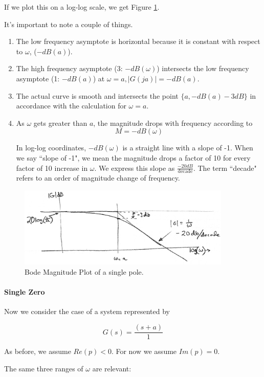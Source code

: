 If we plot this on a log-log scale, we get Figure \ref{BodeMagOnePole}.

It's important to note a couple of things.

\begin{enumerate}
  \item The low frequency asymptote is horizontal because it is constant with respect to $\omega$, ($-dB(a)$).
  \item The high frequency asymptote (3: $-dB(\omega)$) intersects 
         the low frequency asymptote (1: $-dB(a)$) at $\omega = a, |G(ja)| = -dB(a)$.
  \item The actual curve is smooth and intersects the point $\{a, -dB(a)-3dB\}$ in accordance with 
  the calculation for  $\omega = a$.
  \item As $\omega$ gets greater than $a$, the magnitude drops with frequency according to
  $$ M = -dB(\omega) $$

In log-log coordinates, $-dB(\omega)$ is a straight line with a slope of -1.  When we say ``slope of -1", we mean the magnitude drops a factor of 10 for every factor of 10 increase in $\omega$.   We express this slope as $\frac{-20dB}{\mathrm{decade}}$. The term ``decade" refers to an order of magnitude change of frequency.

\end{enumerate}


\begin{figure}\centering
\includegraphics[width=4.0in]{figs05/00734a.png}
\caption{Bode Magnitude Plot of a single pole.}\label{BodeMagOnePole}
\end{figure}


\paragraph{Single Zero}
Now we consider the case of a system represented by

\[
G(s) = \frac{(s+a)}{1}
\]

As before, we assume $Re(p) < 0$.  For now we assume $Im(p) = 0$.

The same three ranges of $\omega$ are relevant:

